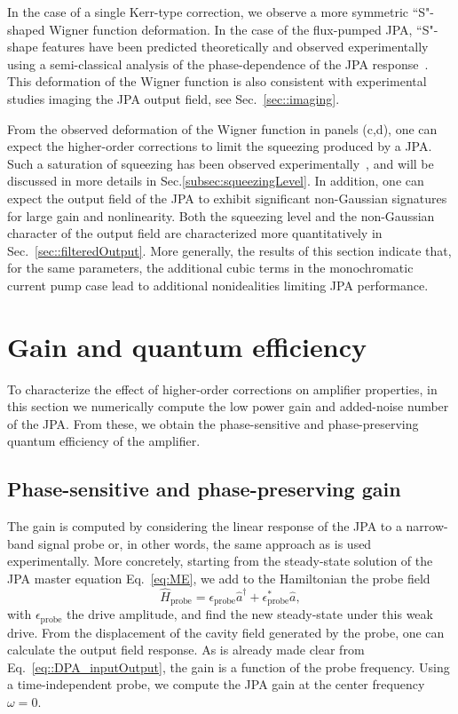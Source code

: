 \documentclass[pra,twocolumn,superscriptaddress]{revtex4-1}
\newcommand{\ah}[0]{\hat{a}}
\begin{document}
In the case of a single Kerr-type correction, we observe a more symmetric ``S"-shaped Wigner function deformation.
In the case of the flux-pumped JPA, ``S"-shape features have been predicted theoretically and observed experimentally using a semi-classical analysis of the phase-dependence of the JPA response~\cite{Wustmann:2013uq,Bienfait:2016yq}.
This deformation of the Wigner function is also consistent with experimental studies imaging the JPA output field, see Sec.~\ref{sec::imaging}.

From the observed deformation of the Wigner function in panels (c,d), one can expect the higher-order corrections to limit the squeezing produced by a JPA. Such a saturation of squeezing has been observed experimentally~\cite{Murch:2013kx,Zhong:2013vn}, and will be discussed in more details in Sec.\ref{subsec:squeezingLevel}.
In addition, one can expect the output field of the JPA to exhibit significant non-Gaussian signatures for large gain and nonlinearity. Both the squeezing level and the non-Gaussian character of the output field are characterized more quantitatively in Sec.~\ref{sec::filteredOutput}.
% 
More generally, the results of this section indicate that, for the same parameters, the additional cubic terms in the monochromatic current pump case lead to additional nonidealities limiting JPA performance. 

\section{Gain and quantum efficiency}
\label{sec::gainEta}

To characterize the effect of higher-order corrections on amplifier properties, in this section we numerically compute the low power gain and added-noise number of the JPA. From these, we obtain the phase-sensitive and phase-preserving quantum efficiency of the amplifier.


\subsection{Phase-sensitive and phase-preserving gain}\label{subsec:gain}
% 
The gain is computed by considering the linear response of the JPA to a narrow-band signal probe or, in other words, the same approach as is used experimentally.
% 
More concretely, starting from the steady-state solution of the JPA master equation Eq.~\eqref{eq:ME}, we add to the Hamiltonian the probe field 
\begin{equation}
	\hat H_{\mathrm{probe}} = \epsilon_{\mathrm{probe}} \ah^\dag + \epsilon_{\mathrm{probe}}^{*} \ah,
\end{equation}
with $\epsilon_{\mathrm{probe}}$ the drive amplitude, and find the new steady-state under this weak drive.
From the displacement of the cavity field generated by the probe, one can calculate the output field response.  
As is already made clear from Eq.~\eqref{eq::DPA_inputOutput}, the gain is a function of the probe frequency.
Using a time-independent probe, we compute the JPA gain at the center frequency $\omega=0$.
\end{document}
